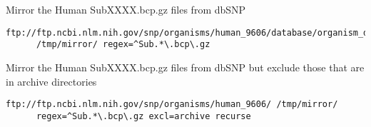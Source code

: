 \documentclass{article}
\begin{document}
\noindent Mirror the Human SubXXXX.bcp.gz files from dbSNP
{\footnotesize
\begin{verbatim}
ftp://ftp.ncbi.nlm.nih.gov/snp/organisms/human_9606/database/organism_data/ 
      /tmp/mirror/ regex=^Sub.*\.bcp\.gz
\end{verbatim}
}
\vspace{1em}

\noindent Mirror the Human SubXXXX.bcp.gz files from dbSNP but exclude
those that are in archive directories
{\footnotesize
\begin{verbatim}
ftp://ftp.ncbi.nlm.nih.gov/snp/organisms/human_9606/ /tmp/mirror/ 
      regex=^Sub.*\.bcp\.gz excl=archive recurse
\end{verbatim}
}
\end{document}
